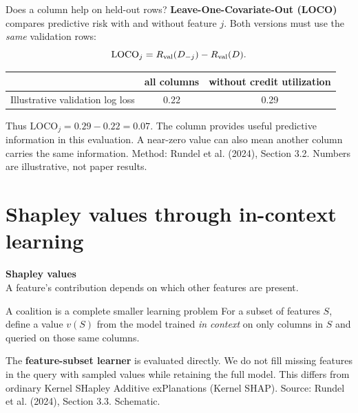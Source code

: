 \documentclass[aspectratio=169]{beamer}
\begin{document}
\begin{frame}{Does a column help on held-out rows?}
  \small
  \textbf{Leave-One-Covariate-Out (LOCO)} compares predictive risk with and
  without feature $j$. Both versions must use the \emph{same} validation rows:
  \[\mathrm{LOCO}_{j}=R_{\rm val}(D_{-j})-R_{\rm val}(D).\]
  \vskip 7pt
  \begin{center}
  \begin{tabular}{lcc}
    & all columns & without credit utilization\\[3pt]\hline
    Illustrative validation log loss & 0.22 & 0.29\\[3pt]
  \end{tabular}
  \end{center}
  \vskip 7pt
  Thus $\mathrm{LOCO}_{j}=0.29-0.22=\boxed{0.07}$. The column provides useful
  predictive information in this evaluation. A near-zero value can also mean
  another column carries the same information.
  \vskip 4pt
  {\scriptsize Method: Rundel et al. (2024), Section 3.2. Numbers are illustrative, not paper results.}
\end{frame}

\section{Shapley values through in-context learning}
\begin{frame}[plain]
  \vfill\centering
  {\Large\color{popblue}\textbf{Shapley values}}\\[9pt]
  {\small A feature's contribution depends on which other features are present.}
  \vfill
\end{frame}

\begin{frame}{A coalition is a complete smaller learning problem}
  \small
  For a subset of features $S$, define a value $v(S)$ from the model trained
  \emph{in context} on only columns in $S$ and queried on those same columns.
  \vskip 8pt
  \begin{center}
  \end{center}
  \vskip 10pt
  The \textbf{feature-subset learner} is evaluated directly. We do not fill
  missing features in the query with sampled values while retaining the full
  model. This differs from ordinary Kernel SHapley Additive exPlanations
  (Kernel SHAP).
  \vskip 4pt
  {\scriptsize Source: Rundel et al. (2024), Section 3.3. Schematic.}
\end{frame}
\end{document}
